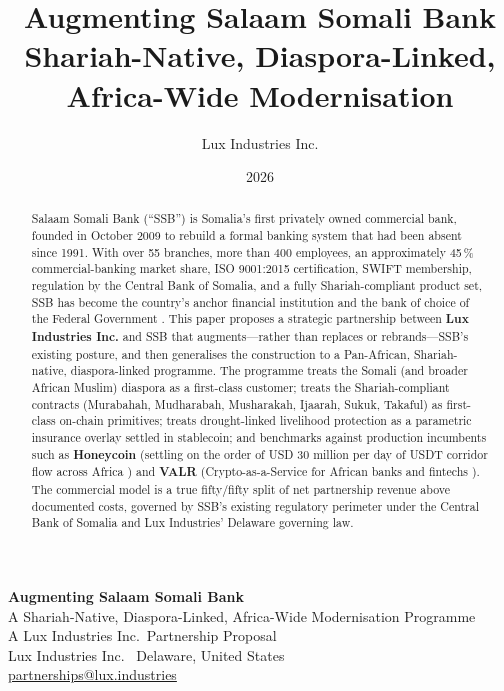 \documentclass[11pt,letterpaper]{article}
\title{Augmenting Salaam Somali Bank \\ \vspace{0.4em}
       Shariah-Native, Diaspora-Linked, Africa-Wide Modernisation}
\author{Lux Industries Inc.}
\date{2026}
\begin{document}
\luxcoverpage

\begin{center}
{\Huge\bfseries\color{luxblue} Augmenting Salaam Somali Bank}\\[0.4em]
{\Large\color{luxaccent} A Shariah-Native, Diaspora-Linked, Africa-Wide Modernisation Programme}\\[0.6em]
{\large A Lux Industries Inc.\ Partnership Proposal}\\[1em]
{\small Lux Industries Inc.\ \textbar{} Delaware, United States\\
\href{mailto:partnerships@lux.industries}{partnerships@lux.industries}}
\end{center}

\vspace{0.6em}

\begin{abstract}
\noindent Salaam Somali Bank (``SSB'') is Somalia's first privately
owned commercial bank, founded in October 2009 to rebuild a formal
banking system that had been absent since 1991. With over 55 branches,
more than 400 employees, an approximately 45\,\% commercial-banking
market share, ISO 9001:2015 certification, SWIFT membership, regulation
by the Central Bank of Somalia, and a fully Shariah-compliant product
set, SSB has become the country's anchor financial institution and the
bank of choice of the Federal Government \cite{wikipedia_ssb,
salaambank_about, salaambank_history, garowe_ssb}. This paper proposes
a strategic partnership between \textbf{Lux Industries Inc.} and SSB
that augments---rather than replaces or rebrands---SSB's existing
posture, and then generalises the construction to a Pan-African,
Shariah-native, diaspora-linked programme. The programme treats the
Somali (and broader African Muslim) diaspora as a first-class customer;
treats the Shariah-compliant contracts (Murabahah, Mudharabah,
Musharakah, Ijaarah, Sukuk, Takaful) as first-class on-chain
primitives; treats drought-linked livelihood protection as a parametric
insurance overlay settled in stablecoin; and benchmarks against
production incumbents such as \textbf{Honeycoin} (settling on the order
of USD 30 million per day of USDT corridor flow across Africa
\cite{honeycoin_techcrunch, honeycoin_site}) and \textbf{VALR}
(Crypto-as-a-Service for African banks and fintechs \cite{valr_caas,
valr_site}). The commercial model is a true fifty/fifty split of net
partnership revenue above documented costs, governed by SSB's existing
regulatory perimeter under the Central Bank of Somalia and Lux
Industries' Delaware governing law.
\end{abstract}
\end{document}
